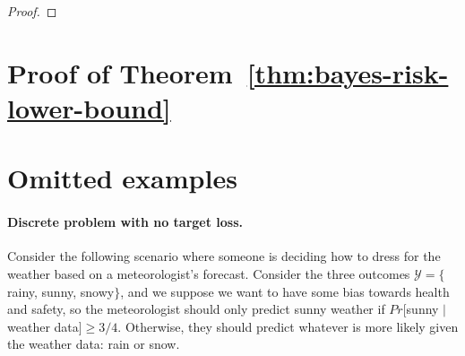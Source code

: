 \documentclass[anon,12pt]{colt2021} %
\newcommand{\reals}{\mathbb{R}}
\newcommand{\simplex}{\Delta_\Y}
\newcommand{\prop}[2][\mathcal{P}]{\mathrm{prop}_{#1}[#2]}
\newcommand{\R}{\mathcal{R}}
\newcommand{\Sc}{\mathcal{S}}  %
\newcommand{\Y}{\mathcal{Y}}
\begin{document}
\begin{proof}
\end{proof}

\section{Proof of Theorem~\ref{thm:bayes-risk-lower-bound}}

\bayesrisklowerbound*



\section{Omitted examples}\label{app:omitted-examples}
\paragraph{Discrete problem with no target loss.}
Consider the following scenario where someone is deciding how to dress for the weather based on a meteorologist's forecast.
Consider the three outcomes $\Y = \{$rainy, sunny, snowy$\}$, and we suppose we want to have some bias towards health and safety, so the meteorologist should only predict sunny weather if $Pr[$sunny $|$ weather data$] \geq 3/4$.
Otherwise, they should predict whatever is more likely  given the weather data: rain or snow.
\end{document}
